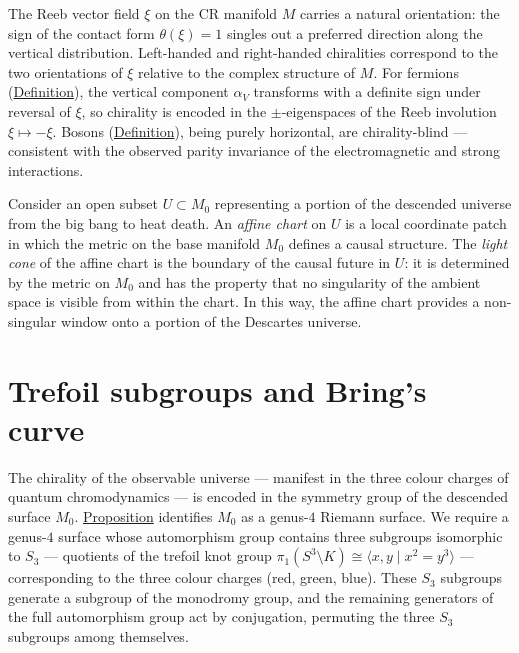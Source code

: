 \begin{remark}
  \label{rem:descartes-chirality}
The Reeb vector field $\xi$ on the CR manifold $M$ carries a natural
orientation: the sign of the contact form $\theta(\xi) = 1$ singles out a
preferred direction along the vertical distribution.  Left-handed and
right-handed chiralities correspond to the two orientations of $\xi$ relative
to the complex structure of $M$.  For fermions
(\hyperref[def:fermion]{Definition}), the vertical component $\alpha_V$ transforms
with a definite sign under reversal of $\xi$, so chirality is encoded in the
$\pm$-eigenspaces of the Reeb involution $\xi \mapsto -\xi$.  Bosons
(\hyperref[def:boson]{Definition}), being purely horizontal, are chirality-blind ---
consistent with the observed parity invariance of the electromagnetic and
strong interactions.
\end{remark}

\begin{remark}
  \label{rem:light-cone-affine}
Consider an open subset $U \subset M_0$ representing a portion of the
descended universe from the big bang to heat death.  An \emph{affine chart}
on $U$ is a local coordinate patch in which the metric on the base manifold
$M_0$ defines a causal structure.  The \emph{light cone} of the affine chart
is the boundary of the causal future in $U$: it is determined by the metric
on $M_0$ and has the property that no singularity of the ambient space is
visible from within the chart.  In this way, the affine chart provides a
non-singular window onto a portion of the Descartes universe.
\end{remark}

\section{Trefoil subgroups and Bring's curve}
\label{sec:trefoil-brings}

\begin{remark}
  \label{rem:chirality-trefoil}
The chirality of the observable universe --- manifest in the three colour
charges of quantum chromodynamics --- is encoded in the symmetry group of the
descended surface $M_0$.  \hyperref[prop:genus-maximal-descent]{Proposition}
identifies $M_0$ as a genus-$4$ Riemann surface.  We require a genus-$4$
surface whose automorphism group contains three subgroups isomorphic to $S_3$
--- quotients of the trefoil knot group
$\pi_1(S^3 \setminus K) \cong \langle x, y \mid x^2 = y^3 \rangle$ ---
corresponding to the three colour charges (red, green, blue).  These $S_3$
subgroups generate a subgroup of the monodromy group, and the remaining
generators of the full automorphism group act by conjugation, permuting the
three $S_3$ subgroups among themselves.
\end{remark}

